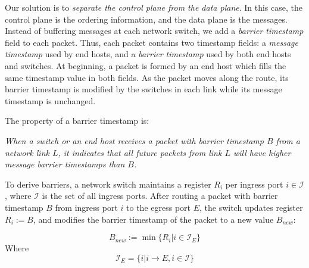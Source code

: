 Our solution is to \textit{separate the control plane from the data plane}.
{In this case, the control plane is the ordering information, and the data plane is the messages.
Instead of buffering messages at each network switch, we add a \textit{barrier timestamp} field to each packet.
Thus, each packet contains two timestamp fields: a \textit{message timestamp} used by end hosts, and a \textit{barrier timestamp} used by both end hosts and switches. 
At beginning, a packet is formed by an end host which fills the same timestamp value in both fields.
As the packet moves along the route,  its barrier timestamp is modified by the switches in each link while its message timestamp is unchanged.}

The property of a barrier timestamp is:

\emph{When a switch or an end host receives a packet with barrier timestamp $B$ from a network link $L$, it indicates that all future packets from link $L$ will have higher message  barrier timestamps than $B$.}

To derive barriers,  a network switch maintains a register $R_i$ per ingress port $i \in \mathcal{I}$, where $\mathcal{I}$ is the set of all ingress ports.
After routing a packet with barrier timestamp $B$ from ingress port $i$ to the egress port $E$, the switch updates register $R_i := B$, and modifies the barrier timestamp of the packet to a new value $B_{new}$:

\begin{equation}\label{equ:derive_barriers}
B_{new}:=\min\{R_i| i\in \mathcal{I}_E\}
\end{equation}
Where 
\begin{equation}\label{equ:derive_barriers1}
\mathcal{I}_E =\{i| i\rightarrow E, i \in \mathcal{I} \}
\end{equation}

